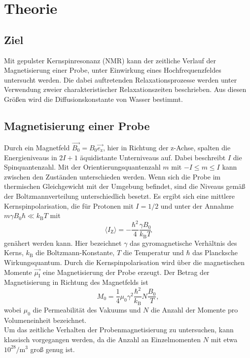 \section{Theorie}
\label{sec:Theorie}
\subsection{Ziel}
Mit gepulster Kernspinresonanz (NMR) kann der zeitliche Verlauf der Magnetisierung
einer Probe, unter Einwirkung eines Hochfrequenzfeldes untersucht werden. Die
dabei auftretenden Relaxationsprozesse werden unter Verwendung zweier
charakteristischer Relaxationszeiten beschrieben.
Aus diesen Größen wird die Diffusionskonstante von Wasser bestimmt.
\subsection{Magnetisierung einer Probe}
Durch ein Magnetfeld $\vec{B_0}=B_0 \vec{e_\text{z}}$, hier in Richtung der z-Achse,
spalten die Energieniveaus
in $2I+1$ äquidistante Unterniveaus auf. Dabei beschreibt $I$ die Spinquantenzahl.
Mit der Orientierungsquantenzahl $m$ mit $-I \leq m \leq I$ kann zwischen
den Zuständen unterschieden werden. Wenn sich die Probe im thermischen
Gleichgewicht mit der Umgebung befindet, sind die Niveaus gemäß der Boltzmannverteilung
unterschiedlich besetzt. Es ergibt sich eine mittlere Kernspinpolarisation, die
für Protonen mit $I=1/2$  und unter der Annahme $m \gamma B_0 \hbar \ll k_\text{B} T$ mit
\begin{equation}
  \langle I_{\text{Z}} \rangle= -\frac{\hbar^2}{4}\frac{\gamma B_0}{k_\text{B} T}
\end{equation}
genähert werden kann. Hier bezeichnet $\gamma$ das gyromagnetische Verhältnis des Kerns,
$k_\text{B}$ die Boltzmann-Konstante, $T$ die Temperatur
und $\hbar$ das Plancksche Wirkungsquantum.
Durch die Kernspinpolarisation wird über die magnetischen Momente $\vec{\mu_\text{I}}$ eine Magnetisierung
der Probe erzeugt. Der Betrag der Magnetisierung in Richtung des Magnetfelds ist
\begin{equation}
  M_0 = \frac{1}{4} \mu_0 \gamma^2 \frac{\hbar^2}{k_\text{B}} N \frac{B_0}{T},
\end{equation}
wobei $\mu_0$ die Permeabilität des Vakuums und
$N$ die Anzahl der Momente pro Volumeneinheit bezeichnet.\\
Um das zeitliche Verhalten der Probenmagnetisierung zu untersuchen, kann klassisch
vorgegangen werden, da die Anzahl an Einzelmomenten $N$ mit etwa $10^{28}/$m$^3$
groß genug ist.
